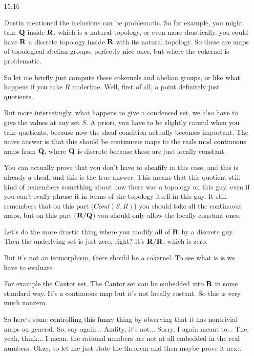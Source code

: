 \begin{unfinished}{15:16}
\begin{example}
\begin{remark}
\begin{remark}
\begin{example}


Dustin mentioned the inclusions can be problematic. So for example, you might take $\mathbf Q$ inside $\mathbf R$, which is a natural topology, or even more drastically, you could have $\mathbf R$ a discrete topology inside $\mathbf R$ with its natural topology. So these are maps of topological abelian groups, perfectly nice ones, but where the cokernel is problematic.

So let me briefly just compute these cokernels and abelian groups, 
or like what happens if you take $R$ underline. Well, first of all, a point definitely just quotients.

But more interestingly, what happens to give a condensed set, we also have to give the values at any set $S$. A priori, you have to be slightly careful when you take quotients, because now the sheaf condition actually becomes important. The naive answer is that this should be continuous maps to the reals mod continuous maps from $\mathbf Q$, where $\mathbf Q$ is discrete because these are just locally constant.

You can actually prove that you don't have to sheafify in this case, and this is already a sheaf, and this is the true answer. This means that this quotient still kind of remembers something about how there was a topology on this guy, even if you can't really phrase it in terms of the topology itself in this guy. It still remembers that on this part ($Cond(S,R)$) you should take all the continuous maps, but on this part ($\mathbf R/\mathbf Q$) you should only allow the locally constant ones.

Let's do the more drastic thing where you modify all of $\mathbf R$ by a discrete guy. Then the underlying set is just zero, right? It's $\mathbf R/\mathbf R$, which is zero.


But it's not an isomorphism, there should be a cokernel. To see what is is we have to evaluate


For example the Cantor set. The Cantor set can be embedded into $\mathbf R$ in some standard way. It's a continuous map but it's not locally costant. So this is very much nonzero.

So here's some controlling this funny thing by observing that it has nontrivial maps on general. So, say again... Andity, it's not... Sorry, I again meant to... The, yeah, think... I mean, the rational numbers are not at all embedded in the real numbers. Okay, so let me just state the theorem and then maybe prove it next.


\end{example}
\end{remark}
\end{remark}
\end{example}
\end{unfinished}
